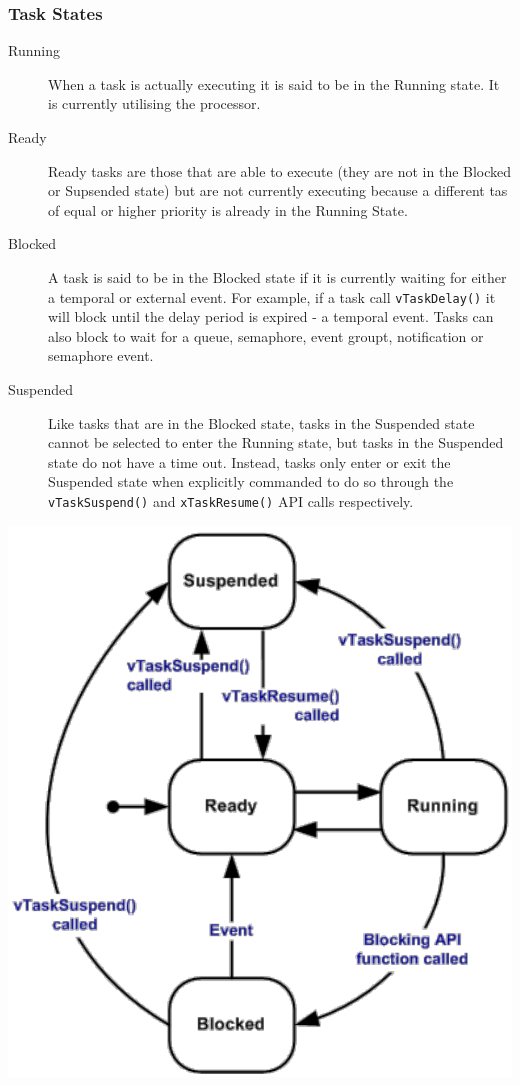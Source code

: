 \subsubsection{Task States}
\begin{minipage}{0.6\textwidth}
    \begin{description}
        \item[Running] When a task is actually executing it is said to be in the Running state.
              It is currently utilising the processor.
        \item[Ready] Ready tasks are those that are able to execute (they are not in the Blocked or Supsended state) but are not currently executing because a different tas of equal or higher priority is already in the Running State.
        \item[Blocked] A task is said to be in the Blocked state if it is currently waiting for either a temporal or external event.
              For example, if a task call \texttt{vTaskDelay()} it will block until the delay period is expired - a temporal event.
              Tasks can also block to wait for a queue, semaphore, event groupt, notification or semaphore event.
        \item[Suspended] Like tasks that are in the Blocked state, tasks in the Suspended state cannot be selected to enter the Running state, but tasks in the Suspended state do not have a time out.
              Instead, tasks only enter or exit the Suspended state when explicitly commanded to do so through the \texttt{vTaskSuspend()} and \texttt{xTaskResume()} API calls respectively.
    \end{description}
\end{minipage}
\begin{minipage}{0.4\textwidth}
    \includegraphics[width=1\textwidth]{images/RTOS/task_states_freertos.png}
\end{minipage}


